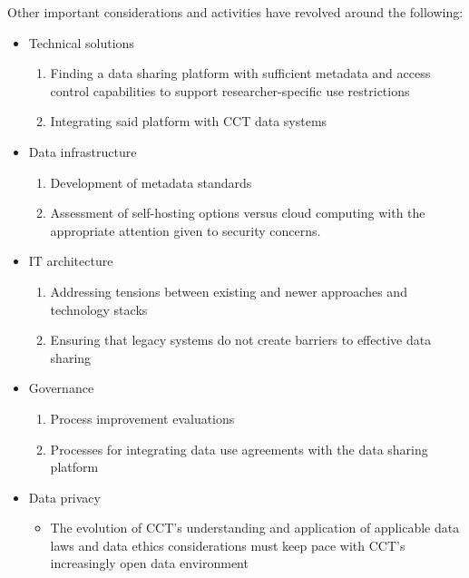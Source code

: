 \documentclass[
]{WileySix}
\providecommand{\tightlist}{%
  \setlength{\itemsep}{0pt}\setlength{\parskip}{0pt}}
\begin{document}
Other important considerations and activities have revolved around the following:

\begin{itemize}
\tightlist
\item
  Technical solutions

  \begin{enumerate}
  \def\labelenumi{\alph{enumi}.}
  \tightlist
  \item
    Finding a data sharing platform with sufficient metadata and access control capabilities to support researcher-specific use restrictions
  \item
    Integrating said platform with CCT data systems
  \end{enumerate}
\item
  Data infrastructure

  \begin{enumerate}
  \def\labelenumi{\alph{enumi}.}
  \tightlist
  \item
    Development of metadata standards
  \item
    Assessment of self-hosting options versus cloud computing with the appropriate attention given to security concerns.
  \end{enumerate}
\item
  IT architecture

  \begin{enumerate}
  \def\labelenumi{\alph{enumi}.}
  \tightlist
  \item
    Addressing tensions between existing and newer approaches and technology stacks
  \item
    Ensuring that legacy systems do not create barriers to effective data sharing
  \end{enumerate}
\item
  Governance

  \begin{enumerate}
  \def\labelenumi{\alph{enumi}.}
  \tightlist
  \item
    Process improvement evaluations
  \item
    Processes for integrating data use agreements with the data sharing platform
  \end{enumerate}
\item
  Data privacy

  \begin{itemize}
  \tightlist
  \item
    The evolution of CCT's understanding and application of applicable data laws and data ethics considerations must keep pace with CCT's increasingly open data environment
  \end{itemize}
\end{itemize}
\end{document}
